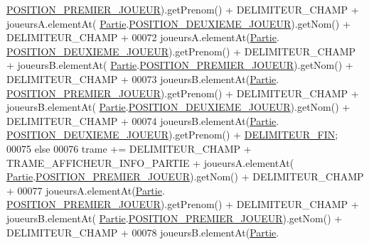 \begin{DoxyCode}
      \hyperlink{classcom_1_1example_1_1area_1_1_partie_a2f977d38424ff199a053d9e3cd4eb8c6}{POSITION\_PREMIER\_JOUEUR}).getPrenom() + DELIMITEUR\_CHAMP + joueursA.elementAt(
      \hyperlink{classcom_1_1example_1_1area_1_1_partie}{Partie}.\hyperlink{classcom_1_1example_1_1area_1_1_partie_a6b5837dffa2af6a8da369f69916498f4}{POSITION\_DEUXIEME\_JOUEUR}).getNom() + DELIMITEUR\_CHAMP +
00072                             joueursA.elementAt(\hyperlink{classcom_1_1example_1_1area_1_1_partie}{Partie}.
      \hyperlink{classcom_1_1example_1_1area_1_1_partie_a6b5837dffa2af6a8da369f69916498f4}{POSITION\_DEUXIEME\_JOUEUR}).getPrenom() + DELIMITEUR\_CHAMP + joueursB.elementAt(
      \hyperlink{classcom_1_1example_1_1area_1_1_partie}{Partie}.\hyperlink{classcom_1_1example_1_1area_1_1_partie_a2f977d38424ff199a053d9e3cd4eb8c6}{POSITION\_PREMIER\_JOUEUR}).getNom() + DELIMITEUR\_CHAMP +
00073                             joueursB.elementAt(\hyperlink{classcom_1_1example_1_1area_1_1_partie}{Partie}.
      \hyperlink{classcom_1_1example_1_1area_1_1_partie_a2f977d38424ff199a053d9e3cd4eb8c6}{POSITION\_PREMIER\_JOUEUR}).getPrenom() + DELIMITEUR\_CHAMP + joueursB.elementAt(
      \hyperlink{classcom_1_1example_1_1area_1_1_partie}{Partie}.\hyperlink{classcom_1_1example_1_1area_1_1_partie_a6b5837dffa2af6a8da369f69916498f4}{POSITION\_DEUXIEME\_JOUEUR}).getNom() + DELIMITEUR\_CHAMP +
00074                             joueursB.elementAt(\hyperlink{classcom_1_1example_1_1area_1_1_partie}{Partie}.
      \hyperlink{classcom_1_1example_1_1area_1_1_partie_a6b5837dffa2af6a8da369f69916498f4}{POSITION\_DEUXIEME\_JOUEUR}).getPrenom() + \hyperlink{classcom_1_1example_1_1area_1_1_protocol_a_r_e_a_a77f13634749dc65bc24d98672ff7ba03}{DELIMITEUR\_FIN};
00075                 \textcolor{keywordflow}{else}
00076                     trame += DELIMITEUR\_CHAMP + TRAME\_AFFICHEUR\_INFO\_PARTIE + joueursA.elementAt(
      \hyperlink{classcom_1_1example_1_1area_1_1_partie}{Partie}.\hyperlink{classcom_1_1example_1_1area_1_1_partie_a2f977d38424ff199a053d9e3cd4eb8c6}{POSITION\_PREMIER\_JOUEUR}).getNom() + DELIMITEUR\_CHAMP +
00077                             joueursA.elementAt(\hyperlink{classcom_1_1example_1_1area_1_1_partie}{Partie}.
      \hyperlink{classcom_1_1example_1_1area_1_1_partie_a2f977d38424ff199a053d9e3cd4eb8c6}{POSITION\_PREMIER\_JOUEUR}).getPrenom() + DELIMITEUR\_CHAMP + joueursB.elementAt(
      \hyperlink{classcom_1_1example_1_1area_1_1_partie}{Partie}.\hyperlink{classcom_1_1example_1_1area_1_1_partie_a2f977d38424ff199a053d9e3cd4eb8c6}{POSITION\_PREMIER\_JOUEUR}).getNom() + DELIMITEUR\_CHAMP +
00078                             joueursB.elementAt(\hyperlink{classcom_1_1example_1_1area_1_1_partie}{Partie}.

\end{DoxyCode}

